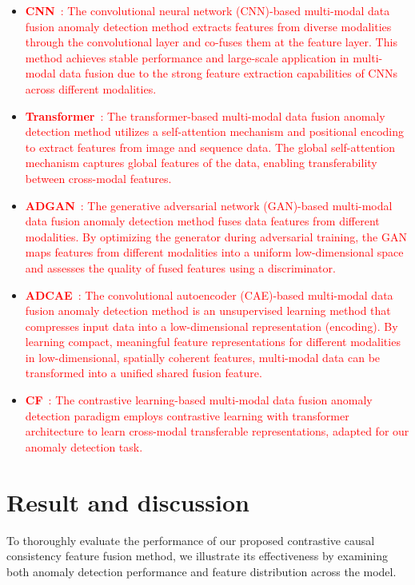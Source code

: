 \documentclass[preprint,12pt]{elsarticle}
\begin{document}
\begin{itemize}
  \item \textcolor{red}{\textbf{CNN}~\cite{RN349}: The convolutional neural network (CNN)-based multi-modal data fusion anomaly detection method extracts features from diverse modalities through the convolutional layer and co-fuses them at the feature layer. This method achieves stable performance and large-scale application in multi-modal data fusion due to the strong feature extraction capabilities of CNNs across different modalities.}
    \item \textcolor{red}{\textbf{Transformer}~\cite{RN352}: The transformer-based multi-modal data fusion anomaly detection method utilizes a self-attention mechanism and positional encoding to extract features from image and sequence data. The global self-attention mechanism captures global features of the data, enabling transferability between cross-modal features.}
    \item \textcolor{red}{\textbf{ADGAN}~\cite{RN334}: The generative adversarial network (GAN)-based multi-modal data fusion anomaly detection method fuses data features from different modalities. By optimizing the generator during adversarial training, the GAN maps features from different modalities into a uniform low-dimensional space and assesses the quality of fused features using a discriminator.}
    \item \textcolor{red}{\textbf{ADCAE}~\cite{RN335}: The convolutional autoencoder (CAE)-based multi-modal data fusion anomaly detection method is an unsupervised learning method that compresses input data into a low-dimensional representation (encoding). By learning compact, meaningful feature representations for different modalities in low-dimensional, spatially coherent features, multi-modal data can be transformed into a unified shared fusion feature.}
    \item \textcolor{red}{\textbf{CF}~\cite{RN354}: The contrastive learning-based multi-modal data fusion anomaly detection paradigm employs contrastive learning with transformer architecture to learn cross-modal transferable representations, adapted for our anomaly detection task.}
\end{itemize}

\section{Result and discussion}

To thoroughly evaluate the performance of our proposed contrastive causal consistency feature fusion method, we illustrate its effectiveness by examining both anomaly detection performance and feature distribution across the model.
\end{document}
